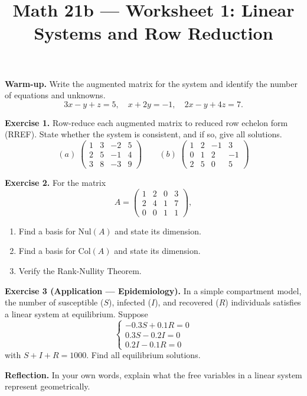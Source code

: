 \documentclass{amsart}
\title{Math 21b --- Worksheet 1: Linear Systems and Row Reduction}
\date{}
\begin{document}
\maketitle

\textbf{Warm-up.} Write the augmented matrix for the system and identify the number of equations and unknowns.
\[
3x - y + z = 5,\quad x + 2y = -1,\quad 2x - y + 4z = 7.
\]

\bigskip

\textbf{Exercise 1.} Row-reduce each augmented matrix to reduced row echelon form (RREF). State whether the system is consistent, and if so, give all solutions.
\[
(a)\;\begin{pmatrix}1&3&-2&5\\2&5&-1&4\\3&8&-3&9\end{pmatrix}
\qquad
(b)\;\begin{pmatrix}1&2&-1&3\\0&1&2&-1\\2&5&0&5\end{pmatrix}
\]

\bigskip

\textbf{Exercise 2.} For the matrix
\[
A = \begin{pmatrix}1&2&0&3\\2&4&1&7\\0&0&1&1\end{pmatrix},
\]
\begin{enumerate}
    \item[(a)] Find a basis for $\text{Nul}(A)$ and state its dimension.
    \item[(b)] Find a basis for $\text{Col}(A)$ and state its dimension.
    \item[(c)] Verify the Rank-Nullity Theorem.
\end{enumerate}

\bigskip

\textbf{Exercise 3 (Application --- Epidemiology).} In a simple compartment model, the number of susceptible ($S$), infected ($I$), and recovered ($R$) individuals satisfies a linear system at equilibrium. Suppose
\[
\begin{cases}
-0.3S + 0.1R = 0 \\
0.3S - 0.2I = 0 \\
0.2I - 0.1R = 0
\end{cases}
\]
with $S + I + R = 1000$. Find all equilibrium solutions.

\bigskip

\textbf{Reflection.} In your own words, explain what the free variables in a linear system represent geometrically.
\end{document}
